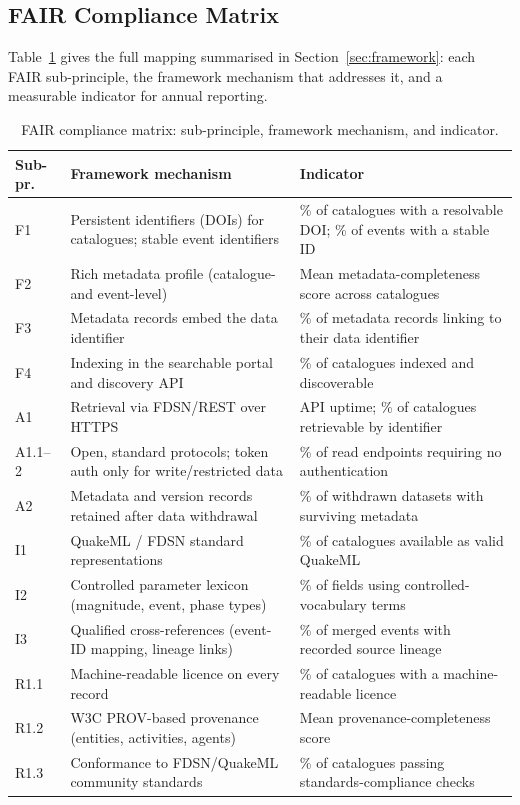 \documentclass[11pt]{article}
\begin{document}
\subsection{FAIR Compliance Matrix}
Table~\ref{tab:fair_matrix} gives the full mapping summarised in Section~\ref{sec:framework}: each FAIR sub-principle, the framework mechanism that addresses it, and a measurable indicator for annual reporting.

\begin{table}[H]
\centering
\small
\caption{FAIR compliance matrix: sub-principle, framework mechanism, and indicator.}
\label{tab:fair_matrix}
\setlength{\tabcolsep}{5pt}
\renewcommand{\arraystretch}{1.15}
\begin{tabular}{p{1.5cm} p{5.2cm} p{5.8cm}}
\toprule
\textbf{Sub-pr.} & \textbf{Framework mechanism} & \textbf{Indicator} \\
\midrule
F1 & Persistent identifiers (DOIs) for catalogues; stable event identifiers & \% of catalogues with a resolvable DOI; \% of events with a stable ID \\
F2 & Rich metadata profile (catalogue- and event-level) & Mean metadata-completeness score across catalogues \\
F3 & Metadata records embed the data identifier & \% of metadata records linking to their data identifier \\
F4 & Indexing in the searchable portal and discovery API & \% of catalogues indexed and discoverable \\
\addlinespace
A1 & Retrieval via FDSN/REST over HTTPS & API uptime; \% of catalogues retrievable by identifier \\
A1.1--2 & Open, standard protocols; token auth only for write/restricted data & \% of read endpoints requiring no authentication \\
A2 & Metadata and version records retained after data withdrawal & \% of withdrawn datasets with surviving metadata \\
\addlinespace
I1 & QuakeML / FDSN standard representations & \% of catalogues available as valid QuakeML \\
I2 & Controlled parameter lexicon (magnitude, event, phase types) & \% of fields using controlled-vocabulary terms \\
I3 & Qualified cross-references (event-ID mapping, lineage links) & \% of merged events with recorded source lineage \\
\addlinespace
R1.1 & Machine-readable licence on every record & \% of catalogues with a machine-readable licence \\
R1.2 & W3C PROV-based provenance (entities, activities, agents) & Mean provenance-completeness score \\
R1.3 & Conformance to FDSN/QuakeML community standards & \% of catalogues passing standards-compliance checks \\
\bottomrule
\end{tabular}
\end{table}
\end{document}
